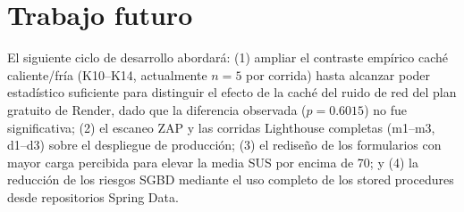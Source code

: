\chapter{Trabajo futuro}
\label{cap:futuro}

El siguiente ciclo de desarrollo abordará: (1) ampliar el contraste empírico
caché caliente/fría (K10--K14, actualmente $n=5$ por corrida) hasta alcanzar
poder estadístico suficiente para distinguir el efecto de la caché del ruido
de red del plan gratuito de Render, dado que la diferencia observada
($p=0.6015$) no fue significativa; (2) el escaneo ZAP y las corridas Lighthouse completas (m1--m3,
d1--d3) sobre el despliegue de producción; (3) el rediseño de los formularios con
mayor carga percibida para elevar la media SUS por encima de 70; y (4) la reducción
de los riesgos SGBD mediante el uso completo de los stored procedures desde
repositorios Spring Data.